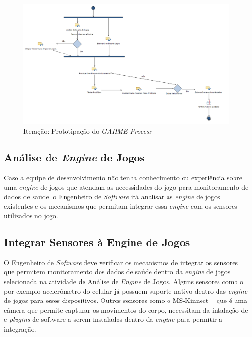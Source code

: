 \begin{figure}
 \centering
 \includegraphics[scale=0.55]{./img/prototipacao.png}
\caption{Iteração: Prototipação do \textit{GAHME Process}}
 \label{fig:prototipaccao}
\end{figure}

\subsection{Análise de \textit{Engine} de Jogos}
Caso a equipe de desenvolvimento não tenha conhecimento ou experiência sobre uma \textit{engine} de jogos que atendam as necessidades do jogo para monitoramento de dados de saúde, o Engenheiro de \textit{Software} irá analisar as \textit{engine} de jogos existentes e os mecanismos que permitam integrar essa \textit{engine} com os sensores utilizados no jogo.

\subsection{Integrar Sensores à Engine de Jogos}
O Engenheiro de \textit{Software} deve verificar os mecanismos de integrar os sensores que permitem monitoramento dos dados de saúde dentro da \textit{engine} de jogos selecionada na atividade de Análise de \textit{Engine} de Jogos. Alguns sensores como o por exemplo acelerômetro do celular já possuem suporte nativo dentro das \textit{engine} de jogos para esses dispositivos. Outros sensores como o MS-Kinnect ~\cite{kinnect2013} que é uma câmera que permite capturar os movimentos do corpo, necessitam da intalação de  e \textit{plugins} de software a serem instalados dentro da \textit{engine} para permitir a integração. 


